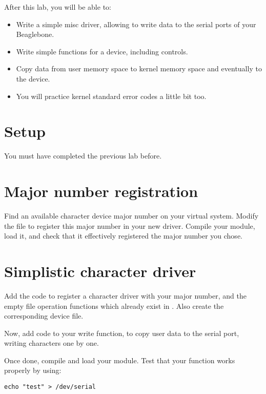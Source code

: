 
After this lab, you will be able to:

\begin{itemize}
\item Write a simple misc driver, allowing to write data to the
  serial ports of your Beaglebone.
\item Write simple  functions for a device,
  including  controls.
\item Copy data from user memory space to kernel memory space and
  eventually to the device.
\item You will practice kernel standard error codes a little bit too.
\end{itemize}

\section{Setup}

You must have completed the previous lab before.

\section{Major number registration}

Find an available character device major number on your virtual
system. Modify the  file to register this major number
in your new driver. Compile your module, load it, and check that it
effectively registered the major number you chose.

\section{Simplistic character driver}

Add the code to register a character driver with your major number, and
the empty file operation functions which already exist in
. Also create the corresponding  device file.

Now, add code to your write function, to copy user data to the serial
port, writing characters one by one.

Once done, compile and load your module. Test that your  function
works properly by using:

\begin{verbatim}
echo "test" > /dev/serial
\end{verbatim}

